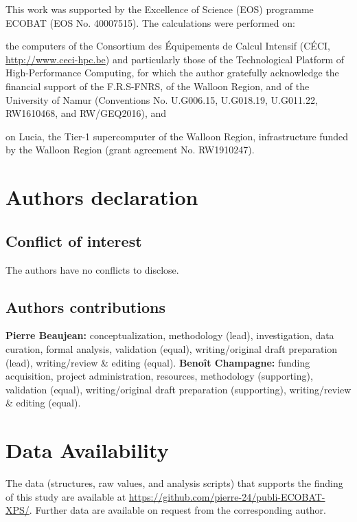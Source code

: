 \documentclass[%
aip,
amsmath,amssymb,
preprint,%
jcp,
showkeys,
]{revtex4-2}
\begin{document}
\begin{acknowledgements}
	This work was supported by the Excellence of Science (EOS) programme  ECOBAT (EOS No. 40007515). 
	The calculations were performed on: \begin{inparaenum}[(i)]
	\item the computers of the Consortium des \'{E}quipements de Calcul Intensif (C\'{E}CI, \url{http://www.ceci-hpc.be}) and particularly those of the Technological Platform of High-Performance Computing, for which the author gratefully acknowledge the financial support of the F.R.S-FNRS, of the Walloon Region, and of the University of Namur (Conventions No.  U.G006.15, U.G018.19, U.G011.22, RW1610468, and RW/GEQ2016), and
	\item on Lucia, the Tier-1 supercomputer of the Walloon Region, infrastructure funded by the Walloon Region (grant agreement No. RW1910247).
	\end{inparaenum} 
\end{acknowledgements}

\section*{Authors declaration}

\subsection*{Conflict of interest}

The authors have no conflicts to disclose.

\subsection*{Authors contributions}

\textbf{Pierre Beaujean:} conceptualization, methodology (lead), investigation, data curation, formal analysis,  validation (equal), writing/original draft preparation (lead), writing/review \& editing (equal). \textbf{Benoît Champagne:} funding acquisition, project administration, resources, methodology (supporting), validation (equal), writing/original draft preparation (supporting), writing/review \& editing (equal).

\section*{Data Availability}

The data (structures, raw values, and analysis scripts) that supports the finding of this study are available at \url{https://github.com/pierre-24/publi-ECOBAT-XPS/}.
Further data are available on request from the corresponding author.



	
\end{document}

